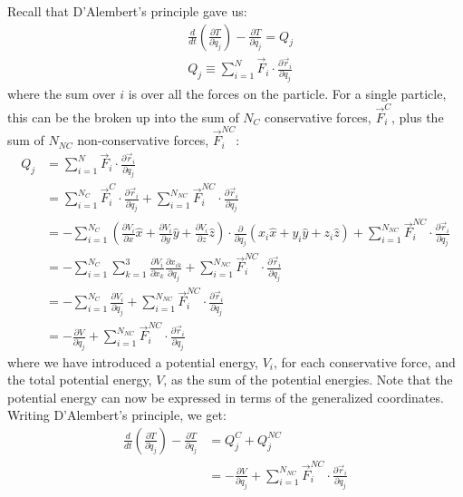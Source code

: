 Recall that D'Alembert's principle gave us:
\begin{align}
&\frac{d}{dt}\left(\frac{\partial T}{\partial \dot{q}_j} \right) - \frac{\partial T}{\partial q_j}=Q_j\nonumber\\
&Q_j\equiv \sum_{i=1}^N\vec{F}_i\cdot\frac{\partial\vec{r}_i}{\partial q_j}
\end{align}
where the sum over $i$ is over all the forces on the particle. For a single particle, this can be the broken up into the sum of $N_C$ conservative forces, $\vec{F}_i^{C}$, plus the sum of $N_{NC}$ non-conservative forces, $\vec{F}_i^{NC}$:
\begin{align}
Q_j&=\sum_{i=1}^N\vec{F}_i\cdot\frac{\partial\vec{r}_i}{\partial q_j}\nonumber\\
   &=\sum_{i=1}^{N_C}\vec{F}_i^{C}\cdot\frac{\partial\vec{r}_i}{\partial q_j}+\sum_{i=1}^{N_{NC}}\vec{F}_i^{NC}\cdot\frac{\partial\vec{r}_i}{\partial q_j}\nonumber\\
   &=-\sum_{i=1}^{N_C}(\frac{\partial V_i}{\partial x}\hat{x}+\frac{\partial V_i}{\partial y}\hat{y}+\frac{\partial V_i}{\partial z}\hat{z} )\cdot\frac{\partial}{\partial q_j}(x_i\hat{x}+y_i\hat{y}+z_i\hat{z}) +\sum_{i=1}^{N_{NC}}\vec{F}_i^{NC}\cdot\frac{\partial\vec{r}_i}{\partial q_j}\nonumber\\
   &=-\sum_{i=1}^{N_C}\sum_{k=1}^{3}\frac{\partial V_i}{\partial x_k} \frac{\partial x_{ik}}{\partial q_j}+ \sum_{i=1}^{N_{NC}}\vec{F}_i^{NC}\cdot\frac{\partial\vec{r}_i}{\partial q_j}\nonumber\\
   &=-\sum_{i=1}^{N_C}\frac{\partial V_i}{\partial q_j} +\sum_{i=1}^{N_{NC}}\vec{F}_i^{NC}\cdot\frac{\partial\vec{r}_i}{\partial q_j}\nonumber\\
   &=-\frac{\partial V}{\partial q_j} +\sum_{i=1}^{N_{NC}}\vec{F}_i^{NC}\cdot\frac{\partial\vec{r}_i}{\partial q_j}
\end{align}
where we have introduced a potential energy, $V_i$, for each conservative force, and the total potential energy, $V$, as the sum of the potential energies. Note that the potential energy can now be expressed in terms of the generalized coordinates. Writing D'Alembert's principle, we get:
\begin{align}
\frac{d}{dt}\left(\frac{\partial T}{\partial \dot{q}_j} \right) - \frac{\partial T}{\partial q_j}&=Q_j^{C}+Q_j^{NC}\nonumber\\
&=-\frac{\partial V}{\partial q_j} +\sum_{i=1}^{N_{NC}}\vec{F}_i^{NC}\cdot\frac{\partial\vec{r}_i}{\partial q_j}
\end{align}
